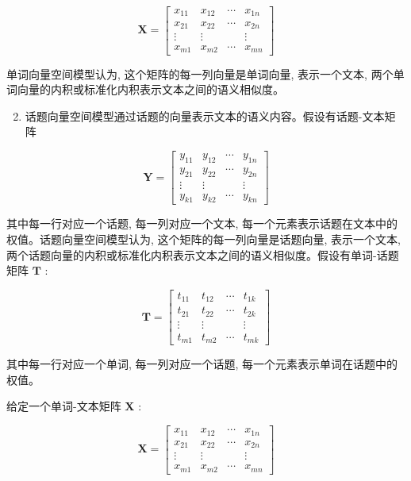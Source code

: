 \documentclass[10pt]{article}
\begin{document}
$$
\boldsymbol{X}=\left[\begin{array}{cccc}
x_{11} & x_{12} & \cdots & x_{1 n} \\
x_{21} & x_{22} & \cdots & x_{2 n} \\
\vdots & \vdots & & \vdots \\
x_{m 1} & x_{m 2} & \cdots & x_{m n}
\end{array}\right]
$$

单词向量空间模型认为, 这个矩阵的每一列向量是单词向量, 表示一个文本, 两个单词向量的内积或标准化内积表示文本之间的语义相似度。

\begin{enumerate}
  \setcounter{enumi}{1}
  \item 话题向量空间模型通过话题的向量表示文本的语义内容。假设有话题-文本矩阵
\end{enumerate}

$$
\boldsymbol{Y}=\left[\begin{array}{cccc}
y_{11} & y_{12} & \cdots & y_{1 n} \\
y_{21} & y_{22} & \cdots & y_{2 n} \\
\vdots & \vdots & & \vdots \\
y_{k 1} & y_{k 2} & \cdots & y_{k n}
\end{array}\right]
$$

其中每一行对应一个话题, 每一列对应一个文本, 每一个元素表示话题在文本中的权值。话题向量空间模型认为, 这个矩阵的每一列向量是话题向量, 表示一个文本, 两个话题向量的内积或标准化内积表示文本之间的语义相似度。假设有单词-话题矩阵 $\boldsymbol{T}$ :

$$
\boldsymbol{T}=\left[\begin{array}{cccc}
t_{11} & t_{12} & \cdots & t_{1 k} \\
t_{21} & t_{22} & \cdots & t_{2 k} \\
\vdots & \vdots & & \vdots \\
t_{m 1} & t_{m 2} & \cdots & t_{m k}
\end{array}\right]
$$

其中每一行对应一个单词, 每一列对应一个话题, 每一个元素表示单词在话题中的权值。

给定一个单词-文本矩阵 $\boldsymbol{X}$ :

$$
\boldsymbol{X}=\left[\begin{array}{cccc}
x_{11} & x_{12} & \cdots & x_{1 n} \\
x_{21} & x_{22} & \cdots & x_{2 n} \\
\vdots & \vdots & & \vdots \\
x_{m 1} & x_{m 2} & \cdots & x_{m n}
\end{array}\right]
$$
\end{document}
